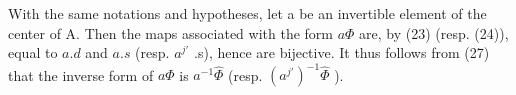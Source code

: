 With the same notations and hypotheses, let a be an invertible element of the center of A. Then the maps associated with the form \(a\Phi\) are, by (23) (resp. (24)), equal to \(a.d\) and \(a.s\) (resp. \(a^{j'}\) .s), hence are bijective. It thus follows from (27) that the inverse form of \(a\Phi\) is \(a^{-1}\widehat{\Phi}\) (resp. \((a^{j'})^{-1}\widehat{\Phi}\) ).

